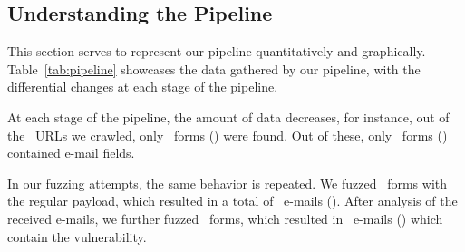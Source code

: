 \subsection[The Pipeline]{Understanding the Pipeline}
This section serves to represent our pipeline quantitatively and graphically. Table~\ref{tab:pipeline} showcases the data gathered by our pipeline, with the differential changes at each stage of the pipeline. 

At each stage of the pipeline, the amount of data decreases, for instance, out of the \urls\ URLs we crawled, only \forms\ forms (\formsDelta) were found. Out of these, only \emailforms\ forms (\emailformsDelta) contained e-mail fields.

In our fuzzing attempts, the same behavior is repeated. We fuzzed \fuzzed\ forms with the regular payload, which resulted in a total of \recd\ e-mails (\recdDelta). After analysis of the received e-mails, we further fuzzed \fuzzed\ forms, which resulted in \success\ e-mails (\successDelta) which contain the vulnerability.



